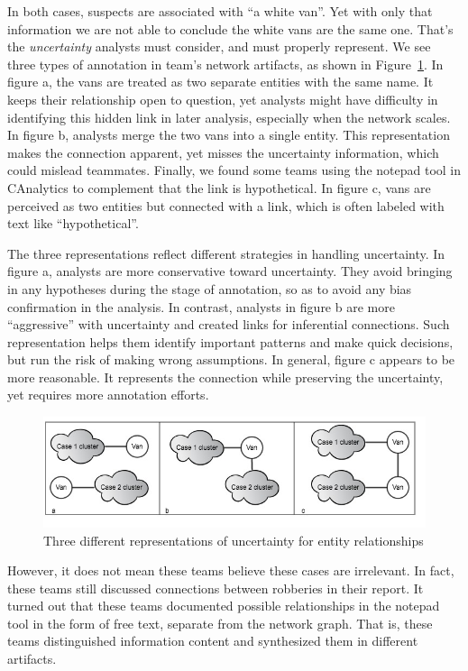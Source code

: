 In both cases, suspects are associated with ``a white van''. Yet with only that information we are not able to conclude the white vans are the same one. That's the \textit{uncertainty} analysts must consider, and must properly represent. We see three types of annotation in team's network artifacts, as shown in Figure~\ref{fig:van}. In figure a, the vans are treated as two separate entities with the same name. It keeps their relationship open to question, yet analysts might have difficulty in identifying this hidden link in later analysis, especially when the network scales. In figure b, analysts merge the two vans into a single entity. This representation makes the connection apparent, yet misses the uncertainty information, which could mislead teammates. Finally, we found some teams using the notepad tool in CAnalytics to complement that the link is hypothetical. In figure c, vans are perceived as two entities but connected with a link, which is often labeled with text like ``hypothetical''. 

The three representations reflect different strategies in handling uncertainty. In figure a, analysts are more conservative toward uncertainty. They avoid bringing in any hypotheses during the stage of annotation, so as to avoid any bias confirmation in the analysis. In contrast, analysts in figure b are more ``aggressive'' with uncertainty and created links for inferential connections. Such representation helps them identify important patterns and make quick decisions, but run the risk of making wrong assumptions. In general, figure c appears to be more reasonable. It represents the connection while preserving the uncertainty, yet requires more annotation efforts. 


\begin{figure}
	\centering
	\includegraphics[width=\columnwidth]{04-Study_one/img/van.jpg}
	\caption{Three different representations of uncertainty for entity relationships\label{fig:van}}
\end{figure}

However, it does not mean these teams believe these cases are irrelevant. In fact, these teams still discussed connections between robberies in their report.
It turned out that these teams documented possible relationships in the notepad tool in the form of free text, separate from the network graph. That is, these teams distinguished information content and synthesized them in different artifacts.

